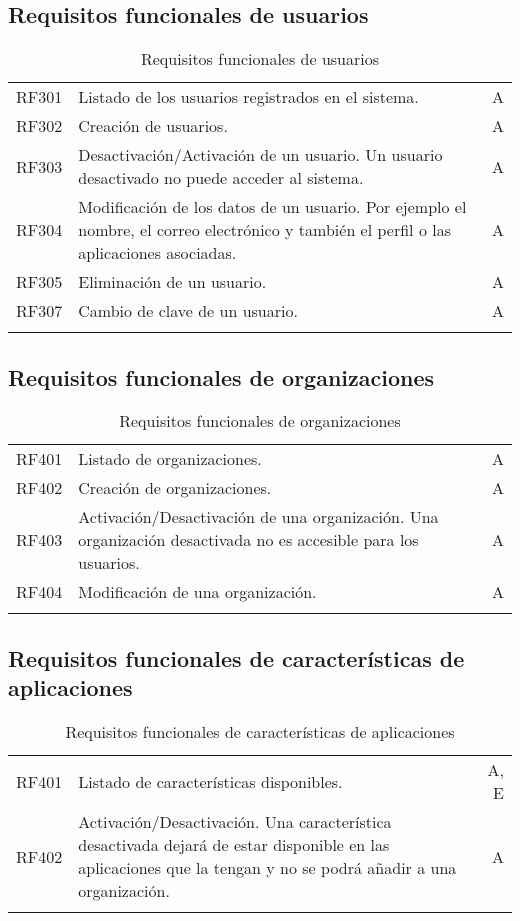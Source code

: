 \subsection{Requisitos funcionales de usuarios}
\label{cuadro:requisitos-funcionales-de-usuarios}
\begin{longtable}{l|p{13cm}|r}
  RF301\label{RF301} & Listado de los usuarios registrados en el sistema. & A \\
  RF302\label{RF302} & Creación de usuarios. & A \\
  RF303\label{RF303} & Desactivación/Activación de un usuario. Un usuario desactivado no puede acceder al sistema. & A \\
  RF304\label{RF304} & Modificación de los datos de un usuario. Por ejemplo el nombre, el correo electrónico y también el perfil o las aplicaciones asociadas. & A \\
  RF305\label{RF305} & Eliminación de un usuario. & A \\
  RF307\label{RF307} & Cambio de clave de un usuario. & A \\
  \caption{Requisitos funcionales de usuarios} \\
\end{longtable}

\subsection{Requisitos funcionales de organizaciones}
\label{cuadro:requisitos-funcionales-de-organizaciones}
\begin{longtable}{l|p{13cm}|r}
  RF401\label{RF401} & Listado de organizaciones. & A \\
  RF402\label{RF402} & Creación de organizaciones. & A \\
  RF403\label{RF403} & Activación/Desactivación de una organización. Una organización desactivada no es accesible para los usuarios. & A \\
  RF404\label{RF404} & Modificación de una organización. & A \\
  \caption{Requisitos funcionales de organizaciones} \\
\end{longtable}

\subsection{Requisitos funcionales de características de aplicaciones}
\label{cuadro:requisitos-funcionales-de-aplicaciones}
\begin{longtable}{l|p{13cm}|r}
  RF401\label{RF401} & Listado de características disponibles. & A, E \\
  RF402\label{RF402} & Activación/Desactivación. Una característica desactivada dejará de estar disponible en las aplicaciones que la tengan y no se podrá añadir a una organización. & A \\
  \caption{Requisitos funcionales de características de aplicaciones} \\
\end{longtable}


